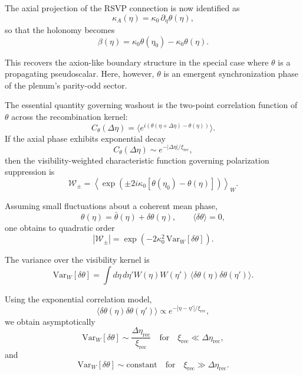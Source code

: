 \documentclass[12pt]{article}
\begin{document}
The axial projection of the RSVP connection is now identified as
\begin{equation}
\kappa_A(\eta)
=
\kappa_0 \, \partial_\eta \theta(\eta),
\end{equation}
so that the holonomy becomes
\begin{equation}
\beta(\eta)
=
\kappa_0 \theta(\eta_0)
-
\kappa_0 \theta(\eta).
\end{equation}

This recovers the axion-like boundary structure in the special case where $\theta$ is a propagating pseudoscalar. Here, however, $\theta$ is an emergent synchronization phase of the plenum’s parity-odd sector.

The essential quantity governing washout is the two-point correlation function of $\theta$ across the recombination kernel:
\begin{equation}
C_\theta(\Delta\eta)
=
\langle
e^{i(\theta(\eta+\Delta\eta) - \theta(\eta))}
\rangle.
\end{equation}
If the axial phase exhibits exponential decay
\begin{equation}
C_\theta(\Delta\eta)
\sim
e^{-|\Delta\eta|/\xi_{\mathrm{rec}}},
\end{equation}
then the visibility-weighted characteristic function governing polarization suppression is
\begin{equation}
\mathcal{W}_\pm
=
\left\langle
\exp
\left(
\pm 2 i \kappa_0
\left[
\theta(\eta_0) - \theta(\eta)
\right]
\right)
\right\rangle_W.
\end{equation}

Assuming small fluctuations about a coherent mean phase,
\begin{equation}
\theta(\eta)
=
\bar{\theta}(\eta)
+
\delta\theta(\eta),
\qquad
\langle \delta\theta \rangle = 0,
\end{equation}
one obtains to quadratic order
\begin{equation}
|\mathcal{W}_\pm|
=
\exp
\left(
-2 \kappa_0^2
\, \mathrm{Var}_W[\delta\theta]
\right).
\end{equation}

The variance over the visibility kernel is
\begin{equation}
\mathrm{Var}_W[\delta\theta]
=
\int d\eta\, d\eta'
W(\eta) W(\eta')
\,
\langle
\delta\theta(\eta)
\delta\theta(\eta')
\rangle.
\end{equation}

Using the exponential correlation model,
\begin{equation}
\langle
\delta\theta(\eta)
\delta\theta(\eta')
\rangle
\propto
e^{-|\eta-\eta'|/\xi_{\mathrm{rec}}},
\end{equation}
we obtain asymptotically
\begin{equation}
\mathrm{Var}_W[\delta\theta]
\sim
\frac{\Delta\eta_{\mathrm{rec}}}{\xi_{\mathrm{rec}}}
\quad
\text{for}
\quad
\xi_{\mathrm{rec}} \ll \Delta\eta_{\mathrm{rec}},
\end{equation}
and
\begin{equation}
\mathrm{Var}_W[\delta\theta]
\sim
\text{constant}
\quad
\text{for}
\quad
\xi_{\mathrm{rec}} \gg \Delta\eta_{\mathrm{rec}}.
\end{equation}
\end{document}
